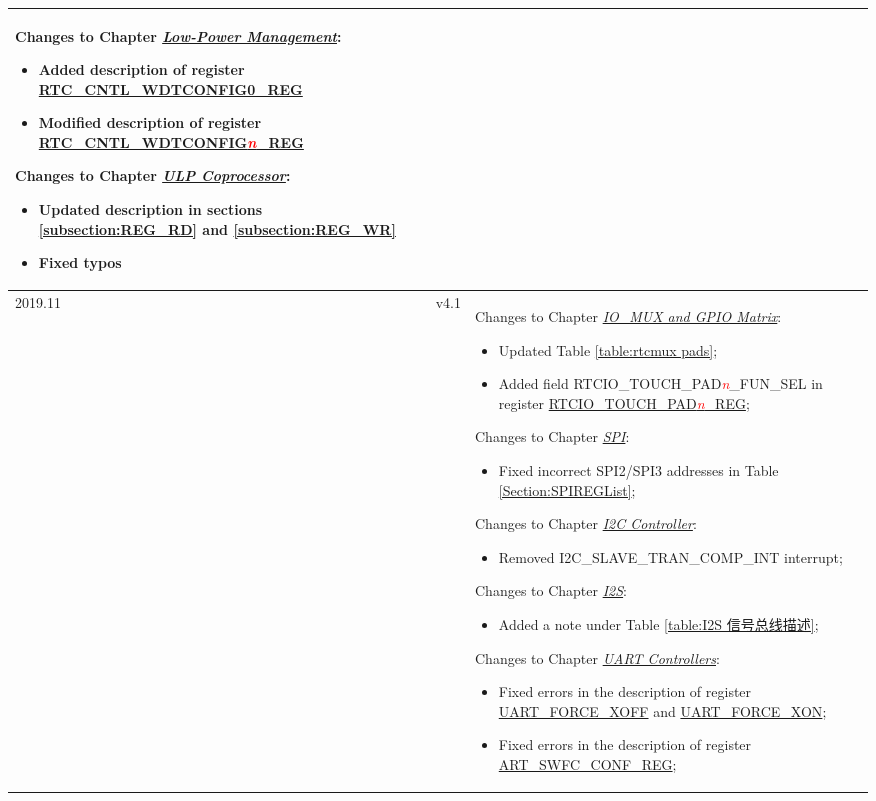 \begin{longtable}[l]{ | m{2cm} | m{1.5cm} | m{12cm} | }
Changes to Chapter \hyperref[mod:lowpowm]{\it{Low-Power Management}}:
\begin{itemize}
\item Added description of register \hyperref[regdesc:RTCCNTLWDTCONFIG0REG]{RTC\_CNTL\_WDTCONFIG0\_REG}
\item Modified description of register \hyperref[regdesc:RTCCNTLWDTCONFIGnREG]{RTC\_CNTL\_WDTCONFIG\textcolor{red}{\it{n}}\_REG}
\end{itemize}

Changes to Chapter \hyperref[mod:ulp]{\it{ULP Coprocessor}}:
\begin{itemize}
\item Updated description in sections \ref{subsection:REG_RD} and \ref{subsection:REG_WR}
\item Fixed typos
\end{itemize}
\vspace{-1em}
\\\hline

2019.11 &v4.1&
Changes to Chapter \hyperref[mod:iomuxgpio]{\it{IO\_MUX and GPIO Matrix}}:
\begin{itemize}
\item Updated Table \ref{table:rtcmux pads};
\item Added field RTCIO\_TOUCH\_PAD\textcolor{red}{\it{n}}\_FUN\_SEL in register \hyperref[regdesc:RTCIOTOUCHPADnREG]{{RTCIO\_TOUCH\_PAD\textcolor{red}{\it{n}}\_REG}};
\end{itemize}

Changes to Chapter \hyperref[mod:spi]{\it{SPI}}:
\begin{itemize}
\item Fixed incorrect SPI2/SPI3 addresses in Table \ref{Section:SPIREGList};
\end{itemize}

Changes to Chapter \hyperref[mod:i2c]{\it{I2C Controller}}:
\begin{itemize}
\item Removed I2C\_SLAVE\_TRAN\_COMP\_INT interrupt;
\end{itemize}

Changes to Chapter \hyperref[mod:i2s]{\it{I2S}}:
\begin{itemize}
\item Added a note under Table \ref{table:I2S 信号总线描述};
\end{itemize}

Changes to Chapter \hyperref[mod:uart]{\it{UART Controllers}}:
\begin{itemize}
\item Fixed errors in the description of register \hyperref[regdesc:UARTFORCEXOFF]{UART\_FORCE\_XOFF} and \hyperref[regdesc:UARTFORCEXON]{UART\_FORCE\_XON};
\item Fixed errors in the description of register \hyperref[regdesc:UARTSWFCCONFREG]{ART\_SWFC\_CONF\_REG};
\end{itemize}


\end{longtable}

